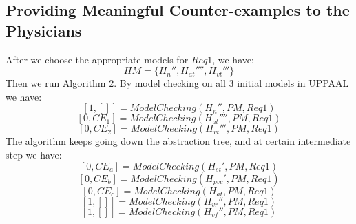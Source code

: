\subsection{Providing Meaningful Counter-examples to the Physicians}
After we choose the appropriate models for $Req1$, we have: 
$$HM=\{H_n'',H_{at}'''',H_{vt}'''\}$$
Then we run Algorithm 2. By model checking on all 3 initial models in UPPAAL we have: 
$$[1,[]]=ModelChecking(H_n'',PM,Req1)$$
 $$[0,CE_1]=ModelChecking(H_{at}'''',PM,Req1)$$
$$[0,CE_2]=ModelChecking(H_{vt}''',PM,Req1)$$
The algorithm keeps going down the abstraction tree, and at certain intermediate step we have:
 $$[0,CE_a]=ModelChecking(H_{st}',PM,Req1)$$
  $$[0,CE_b]=ModelChecking(H_{pvc}',PM,Req1)$$
	$$[0,CE_c]=ModelChecking(H_{at},PM,Req1)$$
 $$[1,[]]=ModelChecking(H_{vr}'',PM,Req1)$$
 $$[1,[]]=ModelChecking(H_{vf}'',PM,Req1)$$

